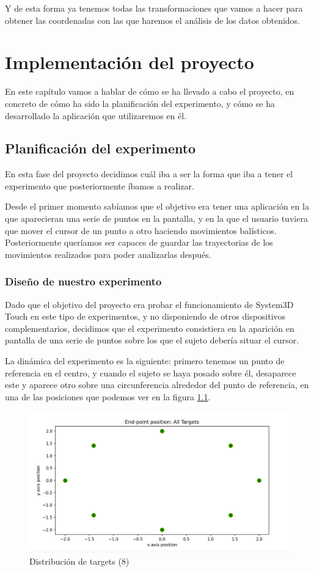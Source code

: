 \documentclass[a4paper,11pt, oneside]{book}
\begin{document}
Y de esta forma ya tenemos todas las transformaciones que vamos a hacer para obtener las coordenadas con las que haremos el análisis de los datos obtenidos.


\chapter{Implementación del proyecto}


En este capítulo vamos a hablar de cómo se ha llevado a cabo el proyecto, en concreto de cómo ha sido la planificación del experimento, y cómo se ha desarrollado la aplicación que utilizaremos en él.

\section{Planificación del experimento}

En esta fase del proyecto decidimos cuál iba a ser la forma que iba a tener el experimento que posteriormente íbamos a realizar.

Desde el primer momento sabíamos que el objetivo era tener una aplicación en la que aparecieran una serie de puntos en la pantalla, y en la que el usuario tuviera que mover el cursor de un punto a otro haciendo movimientos balísticos. Posteriormente queríamos ser capaces de guardar las trayectorias de los movimientos realizados para poder analizarlas después.



\subsection{Diseño de nuestro experimento}

Dado que el objetivo del proyecto era probar el funcionamiento de System3D Touch en este tipo de experimentos, y no disponiendo de otros dispositivos complementarios, decidimos que el experimento consistiera en la aparición en pantalla de una serie de puntos sobre los que el sujeto debería situar el cursor.

La dinámica del experimento es la siguiente: primero tenemos un punto de referencia en el centro, y cuando el sujeto se haya posado sobre él, desaparece este y aparece otro sobre una circunferencia alrededor del punto de referencia, en una de las posiciones que podemos ver en la figura \ref{fig:ocho-puntos}.
\begin{figure}[H]
	
	\centering
	\includegraphics[width=0.7\linewidth]{points}
	\caption{Distribución de targets (8)}
	\label{fig:ocho-puntos}
\end{figure}
\end{document}
